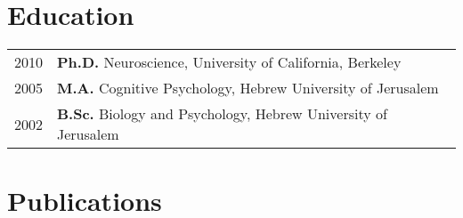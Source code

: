 \documentclass[11pt, a4paper]{article} %
\begin{document}
\section*{Education}

\begin{tabular}{ll}
	2010 & {\bf Ph.D. } Neuroscience, University of California, Berkeley \\
	2005 & {\bf M.A.} Cognitive Psychology, Hebrew University of Jerusalem \\
	2002 & {\bf B.Sc.} Biology and Psychology, Hebrew University of Jerusalem \\
\end{tabular}

\section*{Publications}
\end{document}
